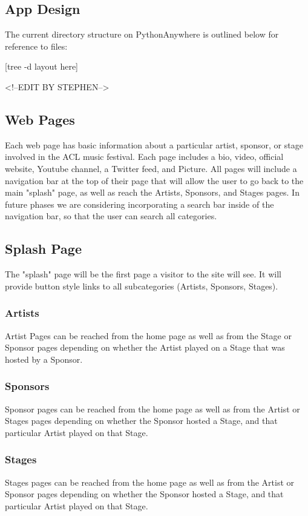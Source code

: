 \subsection{App Design}
The current directory structure on PythonAnywhere is outlined below for reference to files:

[tree -d layout here]

<!--EDIT BY STEPHEN-->
\subsection{Web Pages}
Each web page has basic information about a particular artist, sponsor, or stage involved in the ACL music festival.
Each page includes a bio, video, official website, Youtube channel, a Twitter feed, and Picture. All pages will include a navigation
bar at the top of their page that will allow the user to go back to the main "splash" page, as well as reach the Artists, Sponsors, and
Stages pages. In future phases we are considering incorporating a search bar inside of the navigation bar, so that the user can search 
all categories.

\subsection{Splash Page}
The "splash" page will be the first page a visitor to the site will see. It will provide button style links to all subcategories (Artists,
Sponsors, Stages).
\subsubsection{Artists}
Artist Pages can be reached from the home page as well as from the Stage or Sponsor pages depending on whether the Artist played on
a Stage that was hosted by a Sponsor. 
\subsubsection{Sponsors}
Sponsor pages can be reached from the home page as well as from the Artist or Stages pages depending on whether the Sponsor hosted a 
Stage, and that particular Artist played on that Stage.

\subsubsection{Stages}
Stages pages can be reached from the home page as well as from the Artist or Sponsor pages depending on whether the Sponsor hosted a 
Stage, and that particular Artist played on that Stage.
